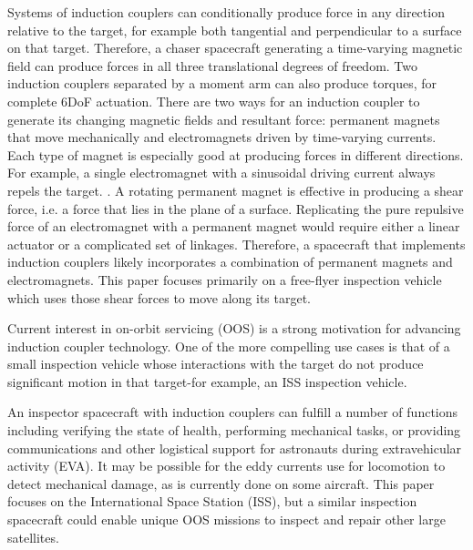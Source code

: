  Systems of induction couplers can conditionally produce force in any direction relative to the target, for example both tangential and perpendicular to a surface on that target. Therefore, a chaser spacecraft generating a time-varying magnetic field can produce forces in all three translational degrees of freedom. Two induction couplers separated by a moment arm can also produce torques, for complete 6DoF actuation.
There are two ways for an induction coupler to generate its changing magnetic fields and resultant force: permanent magnets that move mechanically and electromagnets driven by time-varying currents. Each type of magnet is especially good at producing forces in different directions. For example, a single electromagnet with a sinusoidal driving current always repels the target. \cite{Reinhardt2012}.  A rotating permanent magnet is effective in producing a shear force, i.e. a force that lies in the plane of a surface.  Replicating the pure repulsive force of an electromagnet with a permanent magnet would require either a linear actuator or a complicated set of linkages. Therefore, a spacecraft that implements induction couplers likely incorporates a combination of permanent magnets and electromagnets. This paper focuses primarily on a free-flyer inspection vehicle which uses those shear forces to move along its target. 

 
Current interest in on-orbit servicing (OOS) is a strong motivation for advancing induction coupler technology. \cite{Ambrose2012}
 One of the more compelling use cases is that of a small inspection vehicle whose interactions with the target do not produce significant motion in that target-for example, an ISS inspection vehicle. 
 
An inspector spacecraft with induction couplers can fulfill a number of functions including verifying the state of health, performing mechanical tasks, or providing communications and other logistical support for astronauts during extravehicular activity (EVA). It may be possible for the eddy currents use for locomotion to detect mechanical damage, as is currently done on some aircraft. \cite{Yang2010}
 This paper focuses on the International Space Station (ISS), but a similar inspection spacecraft could enable unique OOS missions to inspect and repair other large satellites.

